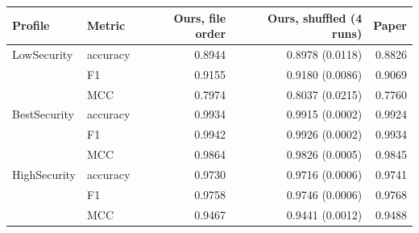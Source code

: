 {\footnotesize
\begin{tabular}{llrrr}
\toprule
\textbf{Profile} & \textbf{Metric} & \textbf{Ours, file order} & \textbf{Ours, shuffled (4 runs)} & \textbf{Paper} \\
\midrule
LowSecurity & accuracy & 0.8944 & 0.8978 (0.0118) & 0.8826 \\
 & F1 & 0.9155 & 0.9180 (0.0086) & 0.9069 \\
 & MCC & 0.7974 & 0.8037 (0.0215) & 0.7760 \\
\addlinespace
BestSecurity & accuracy & 0.9934 & 0.9915 (0.0002) & 0.9924 \\
 & F1 & 0.9942 & 0.9926 (0.0002) & 0.9934 \\
 & MCC & 0.9864 & 0.9826 (0.0005) & 0.9845 \\
\addlinespace
HighSecurity & accuracy & 0.9730 & 0.9716 (0.0006) & 0.9741 \\
 & F1 & 0.9758 & 0.9746 (0.0006) & 0.9768 \\
 & MCC & 0.9467 & 0.9441 (0.0012) & 0.9488 \\
\bottomrule
\end{tabular}
}
